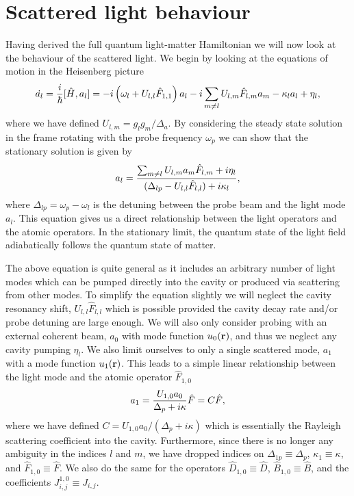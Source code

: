 \section{Scattered light behaviour}
\label{sec:a}

Having derived the full quantum light-matter Hamiltonian we will now
look at the behaviour of the scattered light. We begin by looking at
the equations of motion in the Heisenberg picture
\begin{equation}
  \dot{a_l} = \frac{i}{\hbar} [\hat{H}, a_l] = 
  -i \left(\omega_l + U_{l,l}\hat{F}_{1,1} \right) a_l
   - i \sum_{m \ne l} U_{l,m} \hat{F}_{l,m} a_m
    - \kappa_l a_l + \eta_l,
\end{equation}
where we have defined $U_{l,m} = g_l g_m / \Delta_a$. By considering
the steady state solution in the frame rotating with the probe
frequency $\omega_p$ we can show that the stationary solution is given
by
\begin{equation}
  a_l = \frac{\sum_{m \ne l} U_{l,m} a_m \hat{F}_{l,m} + i \eta_l} 
  {(\Delta_{lp} - U_{l,l} \hat{F}_{l,l}) + i \kappa_l},
\end{equation}
where $\Delta_{lp} = \omega_p - \omega_l$ is the detuning between the
probe beam and the light mode $a_l$. This equation gives us a direct
relationship between the light operators and the atomic operators. In
the stationary limit, the quantum state of the light field
adiabatically follows the quantum state of matter.

The above equation is quite general as it includes an arbitrary number
of light modes which can be pumped directly into the cavity or
produced via scattering from other modes. To simplify the equation
slightly we will neglect the cavity resonancy shift,
$U_{l,l} \hat{F}_{l,l}$ which is possible provided the cavity decay
rate and/or probe detuning are large enough. We will also only
consider probing with an external coherent beam, $a_0$ with mode
function $u_0(\mathbf{r})$, and thus we neglect any cavity pumping
$\eta_l$. We also limit ourselves to only a single scattered mode,
$a_1$ with a mode function $u_1(\mathbf{r})$. This leads to a simple linear
relationship between the light mode and the atomic operator
$\hat{F}_{1,0}$
\begin{equation}
  \label{eq:a}
  a_1 = \frac{U_{1,0} a_0} {\Delta_{p} + i \kappa} \hat{F} =
  C \hat{F},
\end{equation}
where we have defined $C = U_{1,0} a_0 / (\Delta_{p} + i \kappa)$
which is essentially the Rayleigh scattering coefficient into the
cavity. Furthermore, since there is no longer any ambiguity in the
indices $l$ and $m$, we have dropped indices on $\Delta_{1p} \equiv
\Delta_p$, $\kappa_1 \equiv \kappa$, and $\hat{F}_{1,0} \equiv
\hat{F}$. We also do the same for the operators $\hat{D}_{1,0} \equiv
\hat{D}$, $\hat{B}_{1,0} \equiv \hat{B}$, and the coefficients
$J^{1,0}_{i,j} \equiv J_{i,j}$.

